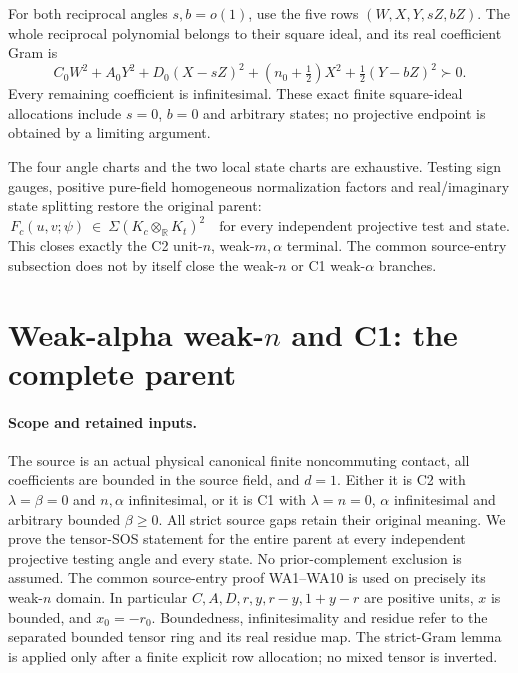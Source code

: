 For both reciprocal angles \(s,b=o(1)\), use the five rows
\((W,X,Y,sZ,bZ)\). The whole reciprocal polynomial belongs
to their square ideal, and its real coefficient Gram is
\[
 C_0W^2+A_0Y^2+D_0(X-sZ)^2
          +(n_0+\tfrac12)X^2+\tfrac12(Y-bZ)^2\succ0 .
 \tag{WA26}
\]
Every remaining coefficient is infinitesimal. These exact finite
square-ideal allocations include \(s=0\), \(b=0\) and arbitrary
states; no projective endpoint is obtained by a limiting argument.

The four angle charts and the two local state charts are exhaustive.
Testing sign gauges, positive pure-field homogeneous normalization
factors and real/imaginary state splitting restore the original parent:
\[
 F_c(u,v;\psi)\ \in\ \Sigma(K_c\otimes_{\mathbb R}K_t)^2
 \quad\text{for every independent projective test and state.}
 \tag{WA27}
\]
This closes exactly the C2 unit-\(n\), weak-\(m,\alpha\) terminal.
The common source-entry subsection does not by itself close the
weak-\(n\) or C1 weak-\(\alpha\) branches.



\section{\texorpdfstring{Weak-alpha weak-\(n\) and C1: the complete parent}{Weak-alpha weak-n and C1: the complete parent}}
\label{component:p0db05df21ad1}

\label{p0db05df21ad1:sec:weak-alpha-weak-n-c1}

\paragraph{Scope and retained inputs.}
The source is an actual physical canonical finite noncommuting contact,
all coefficients are bounded in the source field, and \(d=1\).
Either it is C2 with \(\lambda=\beta=0\) and \(n,\alpha\) infinitesimal,
or it is C1 with \(\lambda=n=0\), \(\alpha\) infinitesimal and arbitrary
bounded \(\beta\geq0\). All strict source gaps retain their original
meaning. We prove the tensor-SOS statement for the entire parent at
every independent projective testing angle and every state.
No prior-complement exclusion is assumed.
The common source-entry proof WA1--WA10 is used on precisely its
weak-\(n\) domain. In particular \(C,A,D,r,y,r-y,1+y-r\) are positive
units, \(x\) is bounded, and \(x_0=-r_0\).
Boundedness, infinitesimality and residue refer
to the separated bounded tensor ring and its real residue map.
The strict-Gram lemma is applied only after a finite explicit row
allocation; no mixed tensor is inverted.

